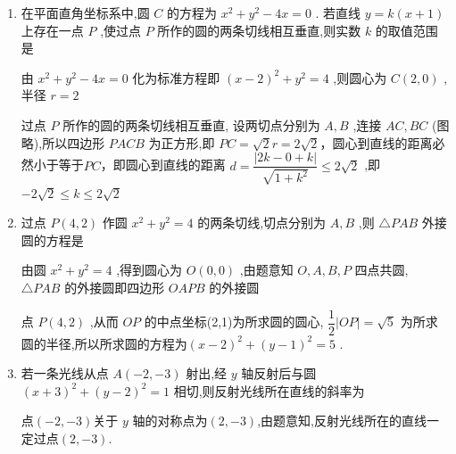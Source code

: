 \begin{enumerate}
\begin{enumerate}
\begin{jieda}
\begin{enumerate}
\begin{dingautolist}{172}
                    由圆心 $C$ 到切线的距离 ${d}^{\prime } = \dfrac{\left| k - 2 + 1 - 3k\right| }{\sqrt{{k}^{2} + 1}} = r = 2$，解得 $k = \dfrac{3}{4}$ .
                    
                    故切线方程为 $y - 1 = \dfrac{3}{4}\left( {x - 3}\right)$，即 ${3x} - {4y} - 5 = 0$ .
                \end{dingautolist}
                综上,过点 $M$ 的圆 $C$ 的切线方程为 $x - 3 = 0$ 或 ${3x} - {4y} - 5 = 0$ .
            \end{enumerate}
        \end{jieda}
        \item 在平面直角坐标系中,圆 $C$ 的方程为 ${x}^{2} + {y}^{2} - {4x} = 0$ . 若直线 $y = k\left( {x + 1}\right)$ 上存在一点 $P$ ,使过点 $P$ 所作的圆的两条切线相互垂直,则实数 $k$ 的取值范围是
        \begin{jieda}
            由 ${x}^{2} + {y}^{2} - {4x} = 0$ 化为标准方程即 ${\left( x - 2\right) }^{2} + {y}^{2} = 4$ ,则圆心为 $C\left( {2,0}\right)$ ,半径 $r = 2$ 
            
            过点 $P$ 所作的圆的两条切线相互垂直, 设两切点分别为 $A,B$ ,连接 ${AC},{BC}$ (图略),所以四边形 ${PACB}$ 为正方形,即 ${PC} = \sqrt{2}r = 2\sqrt{2}$，圆心到直线的距离必然小于等于$PC$，即圆心到直线的距离 $d = \dfrac{\left| 2k - 0 + k\right| }{\sqrt{1 + {k}^{2}}} \leq  2\sqrt{2}$ ,即 $- 2\sqrt{2} \leq  k \leq  2\sqrt{2}$
        \end{jieda}
        
        \item 过点 $P\left( {4,2}\right)$ 作圆 ${x}^{2} + {y}^{2} = 4$ 的两条切线,切点分别为 $A,B$ ,则 $\bigtriangleup  {PAB}$ 外接圆的方程是
        \begin{jieda}
            由圆 ${x}^{2} + {y}^{2} = 4$ ,得到圆心为 $O\left( {0,0}\right)$ ,由题意知 $O,A,B,P$ 四点共圆, $\bigtriangleup {PAB}$ 的外接圆即四边形 ${OAPB}$ 的外接圆
            
            点 $P\left( {4,2}\right)$ ,从而 ${OP}$ 的中点坐标(2,1)为所求圆的圆心, $\dfrac{1}{2}\left| {OP}\right|  = \sqrt{5}$ 为所求圆的半径,所以所求圆的方程为${\left( x - 2\right) }^{2} + {\left( y - 1\right) }^{2} = 5$ .
        \end{jieda}
        \item 若一条光线从点 $A\left( {-2, - 3}\right)$ 射出,经 $y$ 轴反射后与圆 ${\left( x + 3\right) }^{2} + {\left( y - 2\right) }^{2} = 1$ 相切,则反射光线所在直线的斜率为
        \begin{jieda}
            点$(-2, - 3)$关于 $y$ 轴的对称点为$(2, - 3)$,由题意知,反射光线所在的直线一定过点$(2, - 3)$. 
            

\end{jieda}
\end{enumerate}
\end{enumerate}
